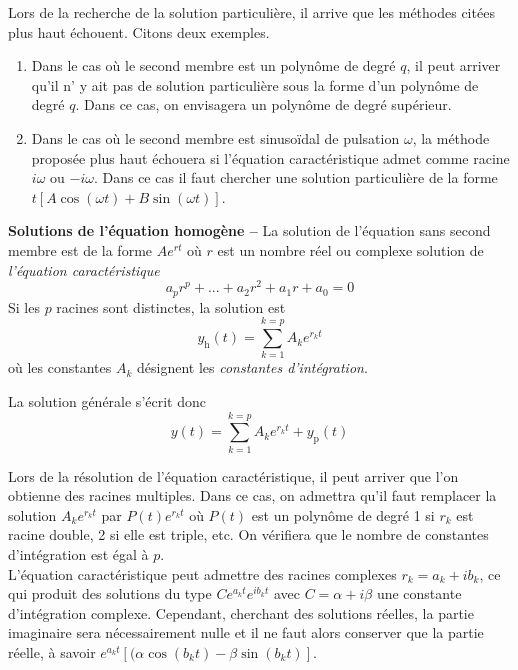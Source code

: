 \begin{kaoremark}
Lors de la recherche de la solution particulière, il arrive que les méthodes citées plus haut échouent. Citons deux exemples.
	\begin{enumerate}
		\item Dans le cas où le second membre est un polynôme de degré $q$, il peut arriver qu'il n' y ait pas de solution particulière sous la forme d'un polynôme de degré $q$. Dans ce cas, on envisagera un polynôme de degré supérieur. 
		\item Dans le cas où le second membre est sinusoïdal de pulsation $\omega$, la méthode proposée plus haut échouera si l'équation caractéristique admet comme racine $i \omega$ ou $-i \omega$. Dans ce cas il faut chercher une solution particulière de la forme $t[A \cos (\omega t) + B \sin(\omega t)]$. 
	\end{enumerate}
\end{kaoremark} 

\textbf{Solutions de l'équation homogène --} La solution de l'équation sans second membre est de la forme $Ae^{rt}$ où $r$ est un nombre réel ou complexe solution de \emph{l'équation caractéristique} 
\[
a_{p}r^{p}+...+a_{2}r^{2}+a_{1}r+a_{0}=0
\]
Si les $p$ racines sont distinctes, la solution est 
\[
y_\text{h}(t)=\sum_{k=1}^{k=p}A_{k}e^{r_{k}t}
\]
où les constantes $A_{k}$ désignent les \emph{constantes d'intégration}.

La solution générale s'écrit donc 
\[
y(t)=\sum_{k=1}^{k=p}A_{k}e^{r_{k}t}+y_\text{p}(t)
\]

\begin{kaoremark}
Lors de la résolution de l'équation caractéristique, il peut arriver que l'on obtienne des racines multiples. Dans ce cas, on admettra qu'il faut remplacer la solution $A_{k}e^{r_{k}t}$ par $P(t)e^{r_{k}t}$ où $P(t)$ est un polynôme de degré 1 si $r_{k}$ est racine double, 2 si elle est triple, etc. On vérifiera que le nombre de constantes d'intégration est égal à $p$.\\
L'équation caractéristique peut admettre des racines complexes $r_{k}=a_{k}+ib_{k}$, ce qui produit des solutions du type $Ce^{a_{k}t}e^{i b_{k}t}$ avec $C=\alpha+i\beta$ une constante d'intégration complexe. Cependant, cherchant des solutions réelles, la partie imaginaire sera nécessairement nulle et il ne faut alors conserver que la partie réelle, à savoir $e^{a_{k}t}\left[(\alpha\cos(b_{k}t)-\beta\sin(b_k t)\right]$.
\end{kaoremark} 
 
